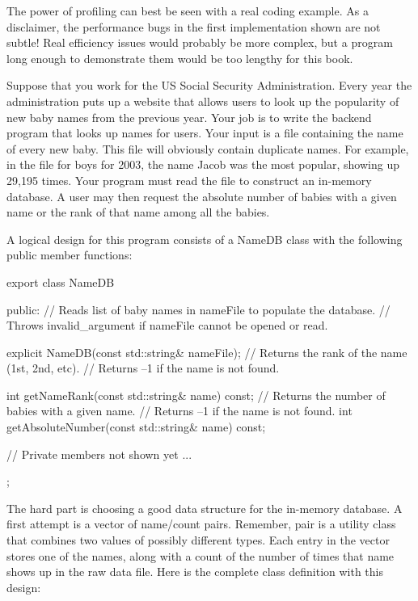 
The power of profiling can best be seen with a real coding example. As a disclaimer, the performance bugs in the first implementation shown are not subtle! Real efficiency issues would probably be more complex, but a program long enough to demonstrate them would be too lengthy for this book.

Suppose that you work for the US Social Security Administration. Every year the administration puts up a website that allows users to look up the popularity of new baby names from the previous year. Your job is to write the backend program that looks up names for users. Your input is a file containing the name of every new baby. This file will obviously contain duplicate names. For example, in the file for boys for 2003, the name Jacob was the most popular, showing up 29,195 times. Your program must read the file to construct an in-memory database. A user may then request the absolute number of babies with a given name or the rank of that name among all the babies.


A logical design for this program consists of a NameDB class with the following public member functions:

\begin{cpp}
export class NameDB
{
    public:
        // Reads list of baby names in nameFile to populate the database.
        // Throws invalid_argument if nameFile cannot be opened or read.

        explicit NameDB(const std::string& nameFile);
        // Returns the rank of the name (1st, 2nd, etc).
        // Returns –1 if the name is not found.

        int getNameRank(const std::string& name) const;
        // Returns the number of babies with a given name.
        // Returns –1 if the name is not found.
        int getAbsoluteNumber(const std::string& name) const;

        // Private members not shown yet ...
};
\end{cpp}

The hard part is choosing a good data structure for the in-memory database. A first attempt is a vector of name/count pairs. Remember, pair is a utility class that combines two values of possibly different types. Each entry in the vector stores one of the names, along with a count of the number of times that name shows up in the raw data file. Here is the complete class definition with this design:

